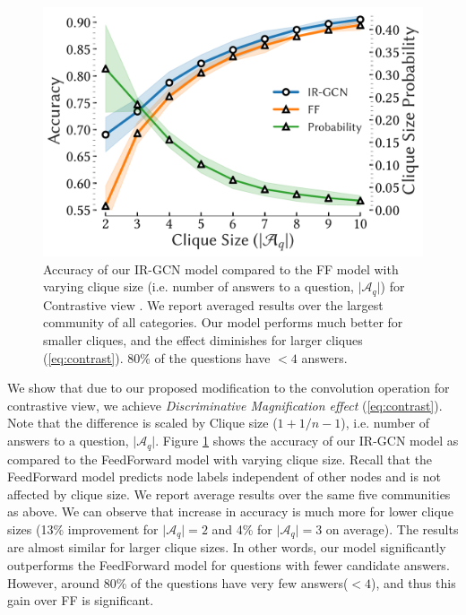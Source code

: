 \begin{figure}[tbh]
  \centering
  \includegraphics[scale=0.5]{figures/clique_acc.pdf}
  \caption{\label{fig:clique} Accuracy of our IR-GCN model compared to the FF model with varying clique size (i.e. number of answers to a question, $\vert \mathcal{A}_q \vert$) for Contrastive view .
We report averaged results over the largest community of all categories. Our model performs much better for smaller cliques, and the effect diminishes for larger cliques (\cref{eq:contrast}). 80\% of the questions have $< 4$ answers.}
\end{figure}

We show that due to our proposed modification to the convolution operation for contrastive view, we achieve \emph{Discriminative Magnification effect} (\cref{eq:contrast}). Note that the difference is scaled by Clique size ($1 + 1/n-1$), i.e. number of answers to a question, $\vert \mathcal{A}_q \vert$. Figure \ref{fig:clique} shows the accuracy of our IR-GCN model as compared to the FeedForward model with varying clique size. Recall that the FeedForward model predicts node labels independent of other nodes and is not affected by clique size. We report average results over the same five communities as above. We can observe that increase in accuracy is much more for lower clique sizes (13\% improvement for $\vert \mathcal{A}_q \vert = 2$ and 4\% for $\vert \mathcal{A}_q \vert = 3$ on average). The results are almost similar for larger clique sizes. In other words, our model significantly outperforms the FeedForward model for questions with fewer candidate answers. However, around 80\% of the questions have very few answers($< 4$), and thus this gain over FF is significant.

